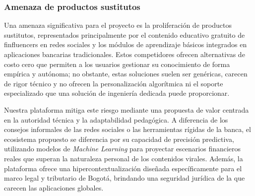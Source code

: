 {}
\subsubsection*{Amenaza de productos sustitutos}

Una amenaza significativa para el proyecto es la proliferación de productos sustitutos, representados principalmente por el contenido educativo gratuito de finfluencers en redes sociales y los módulos de aprendizaje básicos integrados en aplicaciones bancarias tradicionales. Estos competidores ofrecen alternativas de costo cero que permiten a los usuarios gestionar su conocimiento de forma empírica y autónoma; no obstante, estas soluciones suelen ser genéricas, carecen de rigor técnico y no ofrecen la personalización algorítmica ni el soporte especializado que una solución de ingeniería dedicada puede proporcionar.

Nuestra plataforma mitiga este riesgo mediante una propuesta de valor centrada en la autoridad técnica y la adaptabilidad pedagógica. A diferencia de los consejos informales de las redes sociales o las herramientas rígidas de la banca, el ecosistema propuesto se diferencia por su capacidad de precisión predictiva, utilizando modelos de \textit{Machine Learning} para proyectar escenarios financieros reales que superan la naturaleza personal de los contenidos virales. Además, la plataforma ofrece una hipercontextualización diseñada específicamente para el marco legal y tributario de Bogotá, brindando una seguridad jurídica de la que carecen las aplicaciones globales.